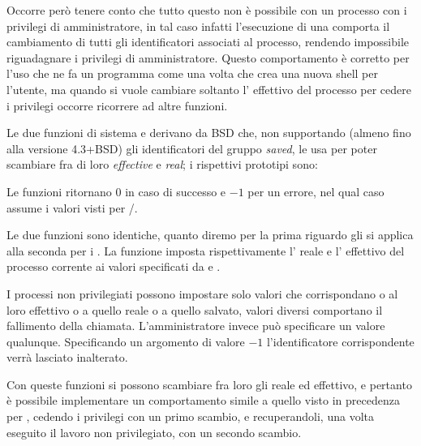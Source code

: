 Occorre però tenere conto che tutto questo non è possibile con un processo con
i privilegi di amministratore, in tal caso infatti l'esecuzione di una
 comporta il cambiamento di tutti gli identificatori associati al
processo, rendendo impossibile riguadagnare i privilegi di amministratore.
Questo comportamento è corretto per l'uso che ne fa un programma come
 una volta che crea una nuova shell per l'utente, ma quando si
vuole cambiare soltanto l' effettivo del processo per cedere i
privilegi occorre ricorrere ad altre funzioni.

Le due funzioni di sistema  e  derivano da BSD
che, non supportando (almeno fino alla versione 4.3+BSD) gli identificatori
del gruppo \textit{saved}, le usa per poter scambiare fra di loro
\textit{effective} e \textit{real}; i rispettivi prototipi sono:

\begin{funcproto}{ 
}
{Le funzioni ritornano $0$ in caso di successo e $-1$ per un errore, nel qual
caso  assume i valori visti per /.
}
\end{funcproto}

Le due funzioni sono identiche, quanto diremo per la prima riguardo gli
 si applica alla seconda per i .  La funzione
 imposta rispettivamente l' reale e l'
effettivo del processo corrente ai valori specificati da 
e .

I processi non privilegiati possono impostare solo valori che corrispondano o
al loro  effettivo o a quello reale o a quello salvato, valori
diversi comportano il fallimento della chiamata.  L'amministratore invece può
specificare un valore qualunque.  Specificando un argomento di valore $-1$
l'identificatore corrispondente verrà lasciato inalterato.

Con queste funzioni si possono scambiare fra loro gli  reale ed
effettivo, e pertanto è possibile implementare un comportamento simile a
quello visto in precedenza per , cedendo i privilegi con un primo
scambio, e recuperandoli, una volta eseguito il lavoro non privilegiato, con
un secondo scambio.

